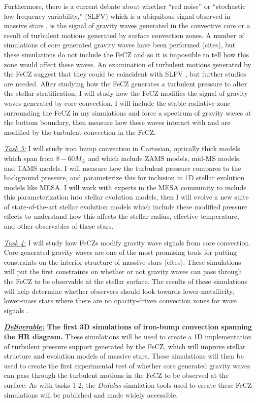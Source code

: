\documentclass[12pt]{article}
\begin{document}
Furthermore, there is a current debate about whether ``red noise'' or ``stochastic low-frequency variability,'' (SLFV) which is a ubiquitous signal observed in massive stars \citep{bowman_etal_2019}, is the signal of gravity waves generated in the convective core or a result of turbulent motions generated by surface convection zones.
A number of simulations of core generated gravity waves have been performed (cites), but these simulations do not include the FeCZ and so it is impossible to tell how this zone would affect these waves.
An examination of turbulent motions generated by the FeCZ suggest that they could be coincident with SLFV \citep{schultz_etal_2022}, but further studies are needed.
After studying how the FeCZ generates a turbulent pressure to alter the stellar stratification, I will study how the FeCZ modifies the signal of gravity waves generated by core convection.
I will include the stable radiative zone surrounding the FeCZ in my simulations and force a spectrum of gravity waves at the bottom boundary, then measure how these waves interact with and are modified by the turbulent convection in the FeCZ.

\emph{\underline{Task 3:}} I will study iron bump convection in Cartesian, optically thick models which span from $8-60 M_{\odot}$ and which include ZAMS models, mid-MS models, and TAMS models.
I will measure how the turbulent pressure compares to the background pressure, and parameterize this for inclusion in 1D stellar evolution models like MESA.
I will work with experts in the MESA community to include this parameterization into stellar evolution models, then I will evolve a new suite of state-of-the-art stellar evolution models which include these modified pressure effects to understand how this affects the stellar radius, effective temperature, and other observables of these stars.

\emph{\underline{Task 4:}} I will study how FeCZs modify gravity wave signals from core convection.
Core-generated gravity waves are one of the most promising tools for putting constraints on the interior structure of massive stars (cites).
These simulations will put the first constraints on whether or not gravity waves can pass through the FeCZ to be observable at the stellar surface.
The results of these simulations will help determine whether observers should look towards lower-metallicity, lower-mass stars where there are no opacity-driven convection zones for wave signals \citep{jermyn_etal_2022_window}.

\textbf{\underline{\emph{Deliverable:}} The first 3D simulations of iron-bump convection spanning the HR diagram.}
These simulations will be used to create a 1D implementation of turbulent pressure support generated by the FeCZ, which will improve stellar structure and evolution models of massive stars.
These simulations will then be used to create the first experimental test of whether core generated gravity waves can pass through the turbulent motions in the FeCZ to be observed at the surface.
As with tasks 1-2, the \emph{Dedalus} simulation tools used to create these FeCZ simulations will be published and made widely accessible.
\end{document}
